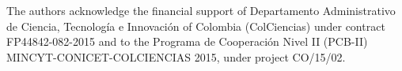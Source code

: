 \documentclass[a4paper,11pt]{article}
\begin{document}



\acknowledgments

The authors acknowledge the financial support of  Departamento Administrativo de Ciencia, Tecnolog\'ia e Innovaci\'on of Colombia (ColCiencias) under contract FP44842-082-2015 and to the Programa de Cooperaci\'on Nivel II (PCB-II) MINCYT-CONICET-COLCIENCIAS 2015, under project CO/15/02.






\end{document}
